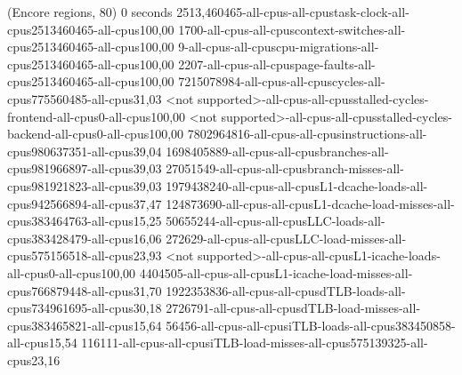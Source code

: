 (Encore regions, 80)
0 seconds
2513,460465-all-cpus-all-cpustask-clock-all-cpus2513460465-all-cpus100,00
1700-all-cpus-all-cpuscontext-switches-all-cpus2513460465-all-cpus100,00
9-all-cpus-all-cpuscpu-migrations-all-cpus2513460465-all-cpus100,00
2207-all-cpus-all-cpuspage-faults-all-cpus2513460465-all-cpus100,00
7215078984-all-cpus-all-cpuscycles-all-cpus775560485-all-cpus31,03
<not supported>-all-cpus-all-cpusstalled-cycles-frontend-all-cpus0-all-cpus100,00
<not supported>-all-cpus-all-cpusstalled-cycles-backend-all-cpus0-all-cpus100,00
7802964816-all-cpus-all-cpusinstructions-all-cpus980637351-all-cpus39,04
1698405889-all-cpus-all-cpusbranches-all-cpus981966897-all-cpus39,03
27051549-all-cpus-all-cpusbranch-misses-all-cpus981921823-all-cpus39,03
1979438240-all-cpus-all-cpusL1-dcache-loads-all-cpus942566894-all-cpus37,47
124873690-all-cpus-all-cpusL1-dcache-load-misses-all-cpus383464763-all-cpus15,25
50655244-all-cpus-all-cpusLLC-loads-all-cpus383428479-all-cpus16,06
272629-all-cpus-all-cpusLLC-load-misses-all-cpus575156518-all-cpus23,93
<not supported>-all-cpus-all-cpusL1-icache-loads-all-cpus0-all-cpus100,00
4404505-all-cpus-all-cpusL1-icache-load-misses-all-cpus766879448-all-cpus31,70
1922353836-all-cpus-all-cpusdTLB-loads-all-cpus734961695-all-cpus30,18
2726791-all-cpus-all-cpusdTLB-load-misses-all-cpus383465821-all-cpus15,64
56456-all-cpus-all-cpusiTLB-loads-all-cpus383450858-all-cpus15,54
116111-all-cpus-all-cpusiTLB-load-misses-all-cpus575139325-all-cpus23,16
